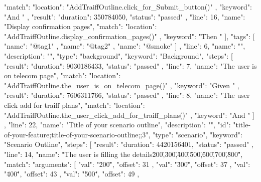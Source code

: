 {{{            "match": {
              "location": "AddTraiffOutline.click_for_Submit_button()"
            },
            "keyword": "And "
          },
          {
            "result": {
              "duration": 350784050,
              "status": "passed"
            },
            "line": 16,
            "name": "Display confirmation pages",
            "match": {
              "location": "AddTraiffOutline.display_confirmation_pages()"
            },
            "keyword": "Then "
          }
        ],
        "tags": [
          {
            "name": "@tag1"
          },
          {
            "name": "@tag2"
          },
          {
            "name": "@smoke"
          }
        ]
      },
      {
        "line": 6,
        "name": "",
        "description": "",
        "type": "background",
        "keyword": "Background",
        "steps": [
          {
            "result": {
              "duration": 9030186433,
              "status": "passed"
            },
            "line": 7,
            "name": "The user is on telecom page",
            "match": {
              "location": "AddTraiffOutline.the_user_is_on_telecom_page()"
            },
            "keyword": "Given "
          },
          {
            "result": {
              "duration": 7606311766,
              "status": "passed"
            },
            "line": 8,
            "name": "The user click add for traiff plans",
            "match": {
              "location": "AddTraiffOutline.the_user_click_add_for_traiff_plans()"
            },
            "keyword": "And "
          }
        ]
      },
      {
        "line": 22,
        "name": "Title of your scenario outline",
        "description": "",
        "id": "title-of-your-feature;title-of-your-scenario-outline;;3",
        "type": "scenario",
        "keyword": "Scenario Outline",
        "steps": [
          {
            "result": {
              "duration": 4420156401,
              "status": "passed"
            },
            "line": 14,
            "name": "The user is filling the details\"200\",\"300\",\"400\",\"500\",\"600\",\"700\",\"800\"",
            "match": {
              "arguments": [
                {
                  "val": "\"200\"",
                  "offset": 31
                },
                {
                  "val": "\"300\"",
                  "offset": 37
                },
                {
                  "val": "\"400\"",
                  "offset": 43
                },
                {
                  "val": "\"500\"",
                  "offset": 49
                },
                {
}}}}}
